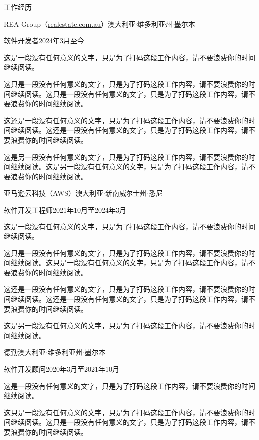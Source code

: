 \documentclass{xsha}
\begin{document}
\begin{xsection}{工作经历}

\begin{xheading}{REA Group（\href{https://realestate.com.au/}{realestate.com.au}）}{澳大利亚$\cdot$维多利亚州$\cdot$墨尔本}
\begin{xsubheading}{软件开发者}{2024年3月至今}
\item 这是一段没有任何意义的文字，只是为了打码这段工作内容，请不要浪费你的时间继续阅读。
\item 这只是一段没有任何意义的文字，只是为了打码这段工作内容，请不要浪费你的时间继续阅读。这只是一段没有任何意义的文字，只是为了打码这段工作内容，请不要浪费你的时间继续阅读。
\item 这还是一段没有任何意义的文字，只是为了打码这段工作内容，请不要浪费你的时间继续阅读。这还是一段没有任何意义的文字，只是为了打码这段工作内容，请不要浪费你的时间继续阅读。
\item 这是另一段没有任何意义的文字，只是为了打码这段工作内容，请不要浪费你的时间继续阅读。这是另一段没有任何意义的文字，只是为了打码这段工作内容，请不要浪费你的时间继续阅读。
\end{xsubheading}
\end{xheading}

\begin{xheading}{亚马逊云科技（AWS）}{澳大利亚$\cdot$新南威尔士州$\cdot$悉尼}
\begin{xsubheading}{软件开发工程师}{2021年10月至2024年3月}
\item 这是一段没有任何意义的文字，只是为了打码这段工作内容，请不要浪费你的时间继续阅读。
\item 这只是一段没有任何意义的文字，只是为了打码这段工作内容，请不要浪费你的时间继续阅读。这只是一段没有任何意义的文字，只是为了打码这段工作内容，请不要浪费你的时间继续阅读。
\item 这还是一段没有任何意义的文字，只是为了打码这段工作内容，请不要浪费你的时间继续阅读。这还是一段没有任何意义的文字，只是为了打码这段工作内容，请不要浪费你的时间继续阅读。
\item 这是另一段没有任何意义的文字，只是为了打码这段工作内容，请不要浪费你的时间继续阅读。
\end{xsubheading}
\end{xheading}

\begin{xheading}{德勤}{澳大利亚$\cdot$维多利亚州$\cdot$墨尔本}
\begin{xsubheading}{软件开发顾问}{2020年3月至2021年10月}
\item 这是一段没有任何意义的文字，只是为了打码这段工作内容，请不要浪费你的时间继续阅读。
\item 这只是一段没有任何意义的文字，只是为了打码这段工作内容，请不要浪费你的时间继续阅读。这只是一段没有任何意义的文字，只是为了打码这段工作内容，请不要浪费你的时间继续阅读。
\end{xsubheading}
\end{xheading}


\end{xsection}
\end{document}
